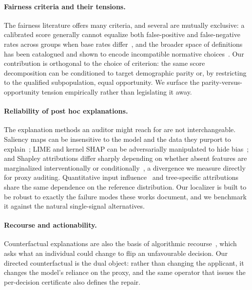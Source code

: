 \documentclass[sn-mathphys-num]{sn-jnl}
\begin{document}
\paragraph{Fairness criteria and their tensions.}
The fairness literature offers many criteria, and several are mutually
exclusive: a calibrated score generally cannot equalize both false-positive and
false-negative rates across groups when base rates
differ~\cite{kleinberg2017inherent,chouldechova2017fair}, and the broader space
of definitions has been catalogued and shown to encode incompatible normative
choices~\cite{verma2018fairness,corbett2018measure,mehrabi2021survey}. Our
contribution is orthogonal to the choice of criterion: the same score
decomposition can be conditioned to target demographic parity or, by restricting
to the qualified subpopulation, equal opportunity. We surface the
parity-versus-opportunity tension empirically rather than legislating it away.

\paragraph{Reliability of post hoc explanations.}
The explanation methods an auditor might reach for are not interchangeable.
Saliency maps can be insensitive to the model and the data they purport to
explain~\cite{adebayo2018sanity}; LIME and kernel SHAP can be adversarially
manipulated to hide bias~\cite{slack2020fooling}; and Shapley attributions differ
sharply depending on whether absent features are marginalized interventionally or
conditionally~\cite{sundararajan2020many,janzing2020feature,aas2021explaining},
a divergence we measure directly for proxy auditing. Quantitative input
influence~\cite{datta2016algorithmic} and tree-specific
attributions~\cite{lundberg2020local} share the same dependence on the reference
distribution. Our localizer is built to be robust to exactly the failure modes
these works document, and we benchmark it against the natural single-signal
alternatives.

\paragraph{Recourse and actionability.}
Counterfactual explanations are also the basis of algorithmic
recourse~\cite{karimi2022survey,wachter2017counterfactual}, which asks what an
individual could change to flip an unfavourable decision. Our directed
counterfactual is the dual object: rather than changing the applicant, it changes
the model's reliance on the proxy, and the same operator that issues the
per-decision certificate also defines the repair.
\end{document}
